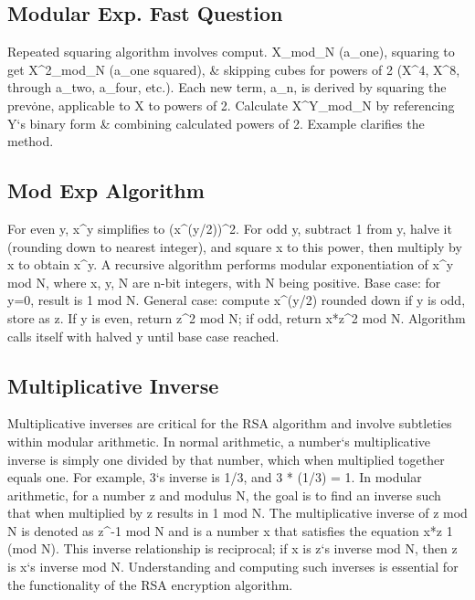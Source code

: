\subsection*{Modular Exp.  Fast Question}
Repeated squaring algorithm involves comput.
X\_mod\_N (a\_one), squaring to get X\textasciicircum{}2\_mod\_N (a\_one squared), \& skipping cubes for powers of 2 (X\textasciicircum{}4, X\textasciicircum{}8, through a\_two, a\_four, etc.).
Each new term, a\_n, is derived by squaring the prev\. one, applicable to X to powers of 2.
Calculate X\textasciicircum{}Y\_mod\_N by referencing Y`s binary form \& combining calculated powers of 2.
Example clarifies the method.

\subsection*{Mod Exp Algorithm}
For even y, x\textasciicircum{}y simplifies to (x\textasciicircum{}(y/2))\textasciicircum{}2.
For odd y, subtract 1 from y, halve it (rounding down to nearest integer), and square x to this power, then multiply by x to obtain x\textasciicircum{}y.
A recursive algorithm performs modular exponentiation of x\textasciicircum{}y mod N, where x, y, N are n-bit integers, with N being positive.
Base case: for y=0, result is 1 mod N\@.
General case: compute x\textasciicircum{}(y/2) rounded down if y is odd, store as z.
If y is even, return z\textasciicircum{}2 mod N; if odd, return x*z\textasciicircum{}2 mod N\@.
Algorithm calls itself with halved y until base case reached.

\subsection*{Multiplicative Inverse}
Multiplicative inverses are critical for the RSA algorithm and involve subtleties within modular arithmetic.
In normal arithmetic, a number`s multiplicative inverse is simply one divided by that number, which when multiplied together equals one.
For example, 3`s inverse is 1/3, and 3 * (1/3) = 1.
In modular arithmetic, for a number z and modulus N, the goal is to find an inverse such that when multiplied by z results in 1 mod N\@.
The multiplicative inverse of z mod N is denoted as z\textasciicircum{}-1 mod N and is a number x that satisfies the equation x*z  1 (mod N).
This inverse relationship is reciprocal; if x is z`s inverse mod N, then z is x`s inverse mod N\@.
Understanding and computing such inverses is essential for the functionality of the RSA encryption algorithm.

